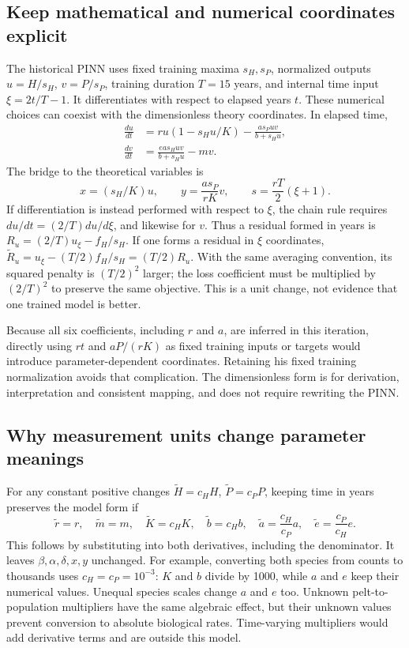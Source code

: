 \subsection{Keep mathematical and numerical coordinates explicit}
The historical PINN \cite{arnav_historical2026} uses fixed training maxima $s_H,s_P$, normalized outputs
$u=H/s_H$, $v=P/s_P$, training duration $T=15$ years, and internal time input
$\xi=2t/T-1$. It differentiates with respect to elapsed years $t$.
These numerical choices can coexist with the dimensionless theory coordinates.
In elapsed time,
\begin{align}
\frac{du}{dt}&=ru(1-s_Hu/K)-\frac{a s_Puv}{b+s_Hu},\\
\frac{dv}{dt}&=\frac{ea s_Huv}{b+s_Hu}-mv.
\end{align}
The bridge to the theoretical variables is
\begin{equation}
x=(s_H/K)u,\qquad y=\frac{a s_P}{rK}v,\qquad
s=\frac{rT}{2}(\xi+1).
\end{equation}
If differentiation is instead performed with respect to $\xi$, the chain rule
requires $du/dt=(2/T)du/d\xi$, and likewise for $v$. Thus a residual formed in
years is $R_u=(2/T)u_\xi-f_H/s_H$. If one forms a residual in $\xi$ coordinates,
$\widetilde R_u=u_\xi-(T/2)f_H/s_H=(T/2)R_u$. With the same averaging convention,
its squared penalty is $(T/2)^2$ larger; the loss coefficient must be multiplied
by $(2/T)^2$ to preserve the same objective. This is a unit change, not evidence
that one trained model is better.

Because all six coefficients, including $r$ and $a$, are inferred in this iteration, directly using $rt$
and $aP/(rK)$ as fixed training inputs or targets would introduce parameter-dependent
coordinates. Retaining his fixed training normalization avoids that complication.
The dimensionless form is for derivation, interpretation and consistent
mapping, and does not require rewriting the PINN.

\subsection{Why measurement units change parameter meanings}
For any constant positive changes $\widetilde H=c_HH$,
$\widetilde P=c_PP$, keeping time in years preserves the model form if
\begin{equation}\label{eq:arnav_unitmap}
\widetilde r=r,\quad \widetilde m=m,\quad
\widetilde K=c_HK,\quad \widetilde b=c_Hb,\quad
\widetilde a=\frac{c_H}{c_P}a,\quad
\widetilde e=\frac{c_P}{c_H}e.
\end{equation}
This follows by substituting into both derivatives, including the denominator.
It leaves $\beta,\alpha,\delta,x,y$ unchanged. For example, converting both species
from counts to thousands uses $c_H=c_P=10^{-3}$: $K$ and $b$ divide by 1000,
while $a$ and $e$ keep their numerical values. Unequal species scales change
$a$ and $e$ too. Unknown pelt-to-population multipliers have the same algebraic
effect, but their unknown values prevent conversion to absolute biological rates.
Time-varying multipliers would add derivative terms and are outside this model.

